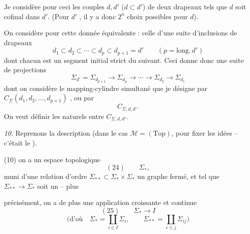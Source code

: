 \documentclass[11pt,a4paper]{article}
\begin{document}
Je considère pour ceci les couples $d,d'$ ($d\subset d'$) de deux drapeaux \struck{\ill{}} tels que $d$ \struck{\ill{}} soit cofinal dans $d'$. (Pour $d'$ ,  il y a donc $2^n$ choix possibles pour $d$).


On considère pour cette donnée équivalente : celle d'une suite d'inclusions de drapeaux
\[
d_1\subset d_2\subset\cdots\subset d_p\subset d_{p+1}=d'\qquad(p=\mathrm{long.}\,d')
\]
dont chacun est un segment initial strict du suivant. Ceci donne donc \struck{\ill{}} une suite de projections
\[
\Sigma_{d'}=\Sigma_{d_{p+1}}\longrightarrow\Sigma_{d_p}\longrightarrow\cdots\longrightarrow\Sigma_{d_2}\longrightarrow\Sigma_{d_1}
\]
dont on considère le mapping-cylindre simultané que je désigne par $C_\Sigma(d_1,d_2,\ldots,d_{p+1})$ , ou par
\[
C_{\Sigma,d,d'} .
\]
On veut définir les   naturels entre  $C_{\Sigma,d,d'}$.

\emph{10.} Reprenons la description \uncertain{\ill{}} (dans le cas $\mathcal{M}=(\mathrm{Top})$, pour fixer les idées -- c'était le ).

(10) \struck{\ill{}}  on a un espace topologique
\[
(24)\qquad \Sigma_{*},
\]
muni d'une relation d'ordre $\Sigma_{**}\subset\Sigma_{*}\times\Sigma_{*}$  un graphe fermé, et tel que  $\Sigma_{**}\to\Sigma_{*}$ soit un  \add{\uncertain{\ill{}}} -- plus


précisément, on a de plus une application croissante et continue
\[
(25)\qquad \Sigma_{*}\longrightarrow I
\]
\[
\Big(\text{d'où}\quad \Sigma_{*}=\coprod_{i\in I}\Sigma_i,\qquad \Sigma_{**}=\coprod_{i\le j}\Sigma_{ij}\Big)
\]
\end{document}
